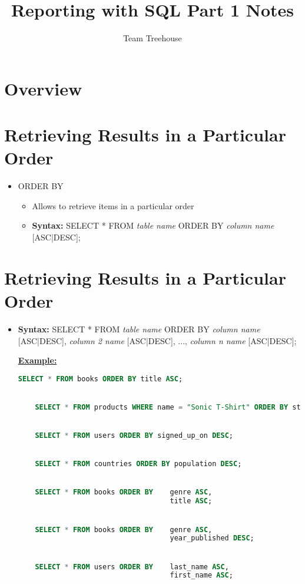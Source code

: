 \documentclass[12pt]{article}
\begin{document}
\title{Reporting with SQL Part 1 Notes}
\author{Team Treehouse}
\maketitle

\bigskip

\section{Overview}

\bigskip

\section{Retrieving Results in a Particular Order}

\bigskip

\begin{itemize}
    \item ORDER BY
    \begin{itemize}
        \item Allows to retrieve items in a particular order
        \item \textbf{Syntax:} SELECT * FROM \textit{table name} ORDER BY \textit{column name} [ASC|DESC];
    \end{itemize}
\end{itemize}

\bigskip

\section{Retrieving Results in a Particular Order}

\bigskip

\begin{itemize}
    \item \textbf{Syntax:} SELECT * FROM \textit{table name} ORDER BY \textit{column name} [ASC|DESC], \textit{column 2 name} [ASC|DESC], ..., \textit{column n name} [ASC|DESC];

    \bigskip

    \underline{\textbf{Example:}}

    \bigskip

    \begin{lstlisting}[language=SQL]
    SELECT * FROM books ORDER BY title ASC;


    SELECT * FROM products WHERE name = "Sonic T-Shirt" ORDER BY stock_count DESC;


    SELECT * FROM users ORDER BY signed_up_on DESC;


    SELECT * FROM countries ORDER BY population DESC;


    SELECT * FROM books ORDER BY    genre ASC,
                                    title ASC;


    SELECT * FROM books ORDER BY    genre ASC,
                                    year_published DESC;


    SELECT * FROM users ORDER BY    last_name ASC,
                                    first_name ASC;
    \end{lstlisting}
\end{itemize}
\end{document}
